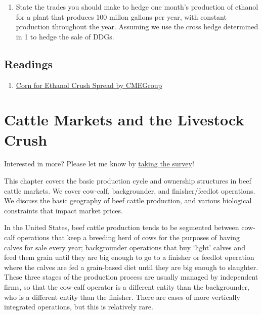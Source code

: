 \documentclass[
  letterpaper,
  DIV=11,
  numbers=noendperiod]{scrreprt}
\providecommand{\tightlist}{%
  \setlength{\itemsep}{0pt}\setlength{\parskip}{0pt}}\usepackage{longtable,booktabs,array}
\begin{document}
\begin{enumerate}
\def\labelenumi{\arabic{enumi}.}
\setcounter{enumi}{1}
\tightlist
\item
  State the trades you should make to hedge one month's production of
  ethanol for a plant that produces 100 millon gallons per year, with
  constant production throughout the year. Assuming we use the cross
  hedge determined in 1 to hedge the sale of DDGs.
\end{enumerate}

\section{Readings}\label{readings-5}

\begin{enumerate}
\def\labelenumi{\arabic{enumi}.}
\tightlist
\item
  \href{http://www.cmegroup.com/trading/agricultural/files/AC-406_DDG_CornCrush_042010.pdf}{Corn
  for Ethanol Crush Spread by CMEGroup}
\end{enumerate}


\chapter{Cattle Markets and the Livestock
Crush}\label{cattle-markets-and-the-livestock-crush}

{Interested in more? Please let me know by}
\href{https://forms.gle/Q3VByCQZHjfQSy9D7}{taking the survey}!

This chapter covers the basic production cycle and ownership structures
in beef cattle markets. We cover cow-calf, backgrounder, and
finisher/feedlot operations. We discuss the basic geography of beef
cattle production, and various biological constraints that impact market
prices.

In the United States, beef cattle production tends to be segmented
between cow-calf operations that keep a breeding herd of cows for the
purposes of having calves for sale every year; backgrounder operations
that buy `light' calves and feed them grain until they are big enough to
go to a finisher or feedlot operation where the calves are fed a
grain-based diet until they are big enough to slaughter. These three
stages of the production process are usually managed by independent
firms, so that the cow-calf operator is a different entity than the
backgrounder, who is a different entity than the finisher. There are
cases of more vertically integrated operations, but this is relatively
rare.
\end{document}
